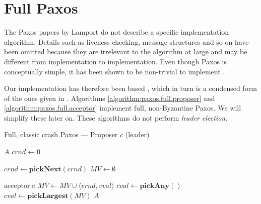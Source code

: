 \section{Full Paxos}

The Paxos papers by Lamport \cite{Lamport:1998:PP:279227.279229,Lam01}
do not describe a specific implementation algorithm.
Details such as liveness checking, message structures and so on have
been omitted because they are irrelevant to the algorithm at large and may be
different from implementation to implementation.  Even though Paxos
is conceptually simple, it has been shown to be non-trivial to implement
\cite{Chandra:2007:PML:1281100.1281103}.

Our implementation has therefore been based 
\cite{Insane.Paxos}, which in turn is a condensed form of the ones given in 
\cite{renesse.paxos,Lam01}.
%
Algorithms \ref{algorithm:paxos.full.proposer} and
\ref{algorithm:paxos.full.acceptor} implement full, non-Byzantine Paxos.
We will simplify these later on.  These algorithms do not perform \textit{leader
election}.

\begin{algorithm}
  \caption{Full, classic crash Paxos --- Proposer $c$ (leader)}
  \label{algorithm:paxos.full.proposer}
  \begin{algorithmic}

    \State $A$ 
    \State $crnd \gets 0$ 
    \State

      \State $crnd \gets \textbf{pickNext}(crnd)$ 
      \State $MV \gets \emptyset$ 
      \State {}
    \EndOn
    \State

       {$\text{acceptor}\ a$} 
        \State $MV \gets MV \cup \langle vrnd, vval \rangle$
            \State $cval \gets \textbf{pickAny}()$ 
          \Else
            \State $cval \gets \textbf{pickLargest}(MV)$ 
          \EndIf
         \State {}
                       {$A$}
        \EndIf
      \EndIf
    \EndOn
  \end{algorithmic}
\end{algorithm}

